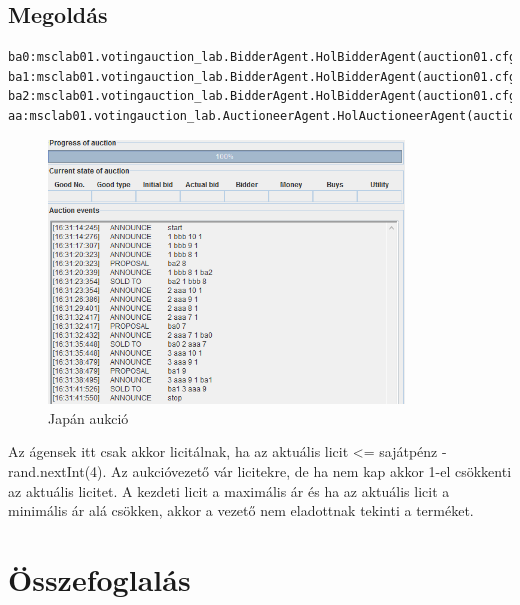 \subsection{Megoldás}
\begin{lstlisting}[caption=Használt run-config, frame=single,float=!ht]
ba0:msclab01.votingauction_lab.BidderAgent.HolBidderAgent(auction01.cfg)
ba1:msclab01.votingauction_lab.BidderAgent.HolBidderAgent(auction01.cfg)
ba2:msclab01.votingauction_lab.BidderAgent.HolBidderAgent(auction01.cfg)
aa:msclab01.votingauction_lab.AuctioneerAgent.HolAuctioneerAgent(auction01.cfg)
\end{lstlisting}
\begin{figure}[!h]
\begin{center}
\includegraphics[height=7cm]{figures/fel5.png}
\caption{Japán aukció}
\end{center}
\end{figure}
Az ágensek itt csak akkor licitálnak, ha az aktuális licit <= sajátpénz - rand.nextInt(4). Az aukcióvezető vár licitekre, de ha nem kap akkor 1-el csökkenti az aktuális licitet. A kezdeti licit a maximális ár és ha az aktuális licit a minimális ár alá csökken, akkor a vezető nem eladottnak tekinti a terméket.


\section{Összefoglalás}
